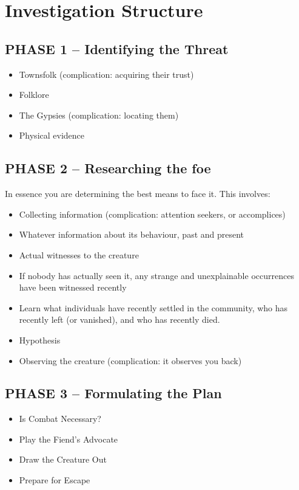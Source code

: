 \chapter{Investigation Structure}

\section{PHASE 1 – Identifying the Threat}
\begin{itemize}
    \item Townsfolk (complication: acquiring their trust)
    \item Folklore
    \item The Gypsies (complication: locating them)
    \item Physical evidence
\end{itemize}

\section{PHASE 2 -- Researching the foe}
In essence you are determining the best means to face it. This involves:
\begin{itemize}
    \item Collecting information (complication: attention seekers, or accomplices)
    \item Whatever information about its behaviour, past and present
    \item Actual witnesses to the creature
    \item If nobody has actually seen it, any strange and unexplainable occurrences have been witnessed recently
    \item Learn what individuals have recently settled in the community, who has recently left (or vanished), and who has recently died.
    \item Hypothesis
    \item Observing the creature (complication: it observes you back)
\end{itemize}

\section{PHASE 3 -- Formulating the Plan}
\begin{itemize}
    \item Is Combat Necessary?
    \item Play the Fiend’s Advocate
    \item Draw the Creature Out
    \item Prepare for Escape
\end{itemize}




